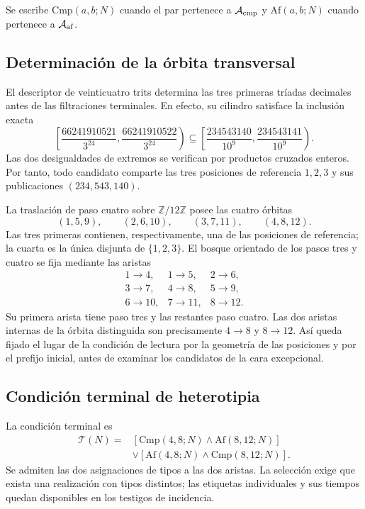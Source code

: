 Se escribe $\mathrm{Cmp}(a,b;N)$ cuando el par pertenece a
$\mathcal A_{\rm cmp}$ y $\mathrm{Af}(a,b;N)$ cuando pertenece a
$\mathcal A_{\rm af}$.

\subsection{Determinación de la órbita transversal}

El descriptor de veinticuatro trits determina las tres primeras
tríadas decimales antes de las filtraciones terminales. En efecto, su
cilindro satisface la inclusión exacta
\[
 \left[\frac{66241910521}{3^{24}},
       \frac{66241910522}{3^{24}}\right)
 \subseteq
 \left[\frac{234543140}{10^9},
       \frac{234543141}{10^9}\right).
\]
Las dos desigualdades de extremos se verifican por productos cruzados
enteros. Por tanto, todo candidato comparte las tres posiciones de
referencia $1,2,3$ y sus publicaciones $(234,543,140)$.

La traslación de paso cuatro sobre $\mathbb Z/12\mathbb Z$ posee las
cuatro órbitas
\[
 (1,5,9),\qquad(2,6,10),\qquad(3,7,11),\qquad(4,8,12).
\]
Las tres primeras contienen, respectivamente, una de las posiciones de
referencia; la cuarta es la única disjunta de $\{1,2,3\}$. El bosque
orientado de los pasos tres y cuatro se fija mediante las aristas
\[
 \begin{array}{lll}
 1\to4,&1\to5,&2\to6,\\
 3\to7,&4\to8,&5\to9,\\
 6\to10,&7\to11,&8\to12.
 \end{array}
\]
Su primera arista tiene paso tres y las restantes paso cuatro. Las dos
aristas internas de la órbita distinguida son precisamente
$4\to8$ y $8\to12$. Así queda fijado el lugar de la condición de
lectura por la geometría de las posiciones y por el prefijo inicial,
antes de examinar los candidatos de la cara excepcional.

\subsection{Condición terminal de heterotipia}

La condición terminal es
\begin{equation}
 \begin{split}
 \mathcal T(N)={}&
 [\mathrm{Cmp}(4,8;N)\wedge\mathrm{Af}(8,12;N)]\\
 &\vee[\mathrm{Af}(4,8;N)\wedge\mathrm{Cmp}(8,12;N)].
 \end{split}
 \label{eq:kdes-heterotipia}
\end{equation}
Se admiten las dos asignaciones de tipos a las dos aristas. La
selección exige que exista una realización con tipos distintos; las
etiquetas individuales y sus tiempos quedan disponibles en los
testigos de incidencia.


